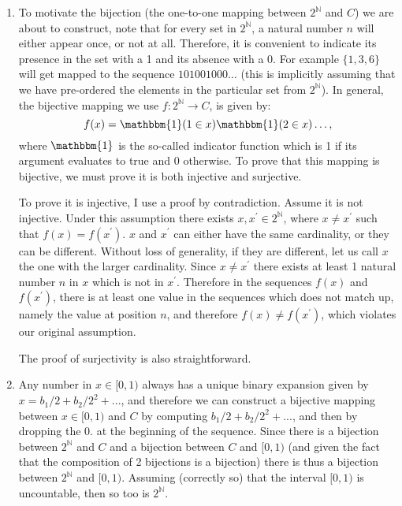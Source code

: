   
    \begin{problem}{10} $ $
    \begin{enumerate}
    \item To motivate the bijection (the one-to-one mapping between $2^{\mathbb N}$ and $C$) we are about to construct, note that for every set in $2^{\mathbb N}$, a natural number $n$ will either appear once, or not at all.  Therefore, it is convenient to indicate its presence in the set with a 1 and its absence with a 0.  For example $\{1, 3, 6 \}$ will get mapped to the sequence $101001000 \ldots$ (this is implicitly assuming that we have pre-ordered the elements in the particular set from $2^{\mathbb N}$).  In general, the bijective mapping we use $f: 2^{\mathbb N} \rightarrow C$, is given by:
    \begin{equation*}
    f(x) = \mathbbm{1}(1\in x)\mathbbm{1}(2\in x) \ldots,
    \end{equation*}
    where $\mathbbm{1}$ is the so-called indicator function which is 1 if its argument evaluates to true and 0 otherwise.  To prove that this mapping is bijective, we must prove it is both injective and surjective.
 
 To prove it is injective, I use a proof by contradiction.  Assume it is not injective.  Under this assumption there exists $x, x^\prime \in 2^{\mathbb N}$, where $x\neq x^\prime$ such that $f(x) = f(x^\prime)$.  $x$ and $x^\prime$ can either have the same cardinality, or they can be different.  Without loss of generality, if they are different, let us call $x$ the one with the larger cardinality.  Since $x \neq x^\prime$ there exists at least 1 natural number $n$ in $x$ which is not in $x^\prime$.  Therefore in the sequences $f(x)$ and $f(x^\prime)$, there is at least one value in the sequences which does not match up, namely the value at position $n$, and therefore $f(x) \neq f(x^\prime)$, which violates our original assumption.
 
 The proof of surjectivity is also straightforward.
     
     \item Any number in $x \in [0, 1)$ always has a unique binary expansion given by $x = b_1/2+b_2/2^2+...$, and therefore we can construct a bijective mapping between $x \in [0, 1)$ and $C$ by computing $b_1/2+b_2/2^2+...$, and then by dropping the 0. at the beginning of the sequence.  Since there is a bijection between $2^{\mathbb N}$ and $C$ and a bijection between $C$ and $[0, 1)$ (and given the fact that the composition of 2 bijections is a bijection) there is thus a bijection between $2^{\mathbb N}$ and $[0, 1)$.  Assuming (correctly so) that the interval $[0, 1)$ is uncountable, then so too is $2^{\mathbb N}$.
     
     
     
     \end{enumerate}
     
  \end{problem} 
  
